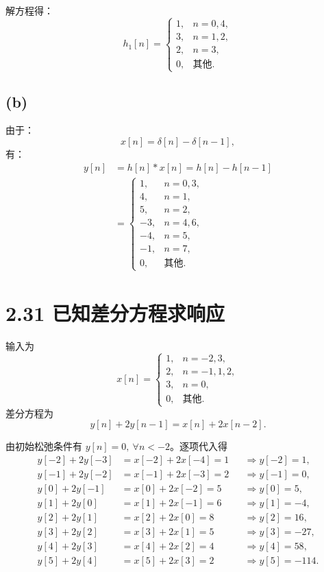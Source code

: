 \documentclass[UTF8, fontset=fandol,12pt, a4paper]{ctexart}
\begin{document}
解方程得：
\[
  \boxed{
  h_1[n]=\begin{cases}
    1, &n=0,4,\\[0.3em]
    3, &n=1,2,\\[0.3em]
    2, &n=3,\\[0.3em]
    0, &\text{其他}.
  \end{cases}}
\]

\newpage
\subsection* {(b)}
由于：
\[
  x[n]=\delta[n]-\delta[n-1],
\]
有：
\begin{align*}
  y[n] &=h[n]*x[n]=h[n]-h[n-1] \\
       &=\boxed{\begin{cases}
          1, &n=0,3,\\[0.3em]
          4, &n=1,\\[0.3em]
          5, &n=2,\\[0.3em]
          -3, &n=4,6,\\[0.3em]
          -4, &n=5,\\[0.3em]
          -1, &n=7,\\[0.3em]
          0, &\text{其他}.
        \end{cases}}
\end{align*}

\section* {2.31 已知差分方程求响应}

输入为
\[
  x[n]=\begin{cases}
    1, &n=-2,3,\\[0.3em]
    2, &n=-1,1,2,\\[0.3em]
    3, &n=0,\\[0.3em]
    0, &\text{其他}.
  \end{cases}
\]
差分方程为
\[
  y[n]+2y[n-1]=x[n]+2x[n-2].
\]

由初始松弛条件有 $y[n]=0,\ \forall n<-2$。逐项代入得
\begin{align*}
  y[-2]+2y[-3] &=x[-2]+2x[-4]=1
    &&\Longrightarrow y[-2]=1,\\
  y[-1]+2y[-2] &=x[-1]+2x[-3]=2
    &&\Longrightarrow y[-1]=0,\\
  y[0]+2y[-1] &=x[0]+2x[-2]=5
    &&\Longrightarrow y[0]=5,\\
  y[1]+2y[0] &=x[1]+2x[-1]=6
    &&\Longrightarrow y[1]=-4,\\
  y[2]+2y[1] &=x[2]+2x[0]=8
    &&\Longrightarrow y[2]=16,\\
  y[3]+2y[2] &=x[3]+2x[1]=5
    &&\Longrightarrow y[3]=-27,\\
  y[4]+2y[3] &=x[4]+2x[2]=4
    &&\Longrightarrow y[4]=58,\\
  y[5]+2y[4] &=x[5]+2x[3]=2
    &&\Longrightarrow y[5]=-114.
\end{align*}
\end{document}
